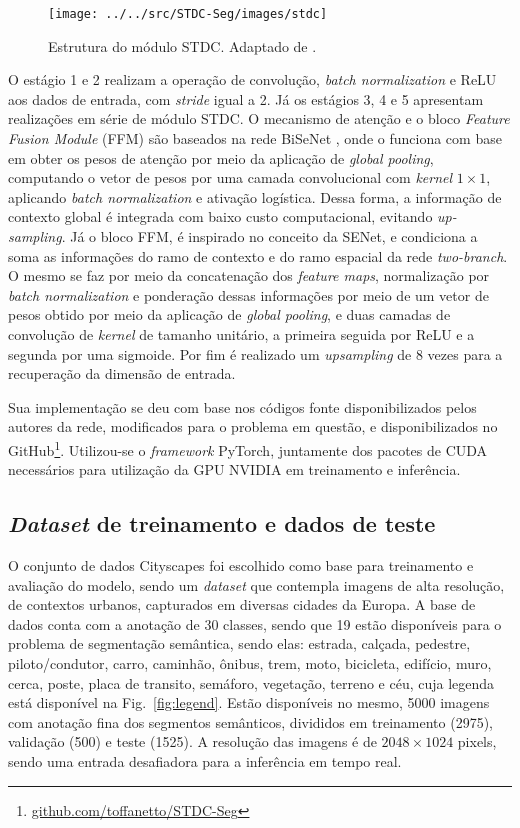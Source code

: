 \documentclass[conference]{IEEEtran}
\begin{document}
\begin{figure}[h!]
	\centering
	\texttt{[image: ../../src/STDC-Seg/images/stdc]}
	\caption{Estrutura do módulo STDC. Adaptado de \cite{fan2021RethinkingBiSeNetRealtime}.}
	\label{fig:stdc}
\end{figure}


O estágio 1 e 2 realizam a operação de convolução, \textit{batch normalization} e ReLU aos dados de entrada, com \textit{stride} igual a 2. Já os estágios 3, 4 e 5 apresentam realizações em série de módulo STDC. O mecanismo de atenção e o bloco \textit{Feature Fusion Module} (FFM) são baseados na rede BiSeNet \cite{yu2018BiSeNetBilateralSegmentation}, onde o funciona com base em obter os pesos de atenção por meio da aplicação de \textit{global pooling}, computando o vetor de pesos por uma camada convolucional com \textit{kernel} $1 \times 1$, aplicando \textit{batch normalization} e ativação logística. Dessa forma, a informação de contexto global é integrada com baixo custo computacional, evitando \textit{up-sampling}. Já o bloco FFM, é inspirado no conceito da SENet, e condiciona a soma as informações do ramo de contexto e do ramo espacial da rede \textit{two-branch}. O mesmo se faz por meio da concatenação dos \textit{feature maps}, normalização por \textit{batch normalization} e ponderação dessas informações por meio de um vetor de pesos obtido por meio da aplicação de \textit{global pooling}, e duas camadas de convolução de \textit{kernel} de tamanho unitário, a primeira seguida por ReLU e a segunda por uma sigmoide. Por fim é realizado um \textit{upsampling} de 8 vezes para a recuperação da dimensão de entrada.

Sua implementação se deu com base nos códigos fonte disponibilizados pelos autores da rede, modificados para o problema em questão, e disponibilizados no GitHub\footnote{\href{https://github.com/toffanetto/STDC-Seg}{github.com/toffanetto/STDC-Seg}}. Utilizou-se o \textit{framework} PyTorch, juntamente dos pacotes de CUDA necessários para utilização da GPU NVIDIA em treinamento e inferência.


\subsection{\textit{Dataset} de treinamento e dados de teste}

O conjunto de dados Cityscapes \cite{cordts2016CityscapesDatasetSemantic} foi escolhido como base para treinamento e avaliação do modelo, sendo um \textit{dataset} que contempla imagens de alta resolução, de contextos urbanos, capturados em diversas cidades da Europa. A base de dados conta com a anotação de 30 classes, sendo que 19 estão disponíveis para o problema de segmentação semântica, sendo elas: estrada, calçada, pedestre, piloto/condutor, carro, caminhão, ônibus, trem, moto, bicicleta, edifício, muro, cerca, poste, placa de transito, semáforo, vegetação, terreno e céu, cuja legenda está disponível na Fig.~\ref{fig:legend}. Estão disponíveis no mesmo, 5000 imagens com anotação fina dos segmentos semânticos, divididos em treinamento (2975), validação (500) e teste (1525). A resolução das imagens é de $2048 \times 1024$ pixels, sendo uma entrada desafiadora para a inferência em tempo real.
\end{document}
